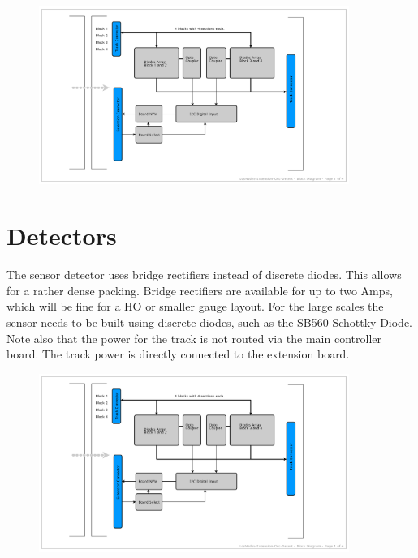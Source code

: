 \begin{figure}[htbp]
    \centering
    \includegraphics[page=2, width=0.9\textwidth]{./Schematics/Schematic_LcsNodes-Extension-4x4-Occ-Detect.pdf}
\end{figure}
\FloatBarrier

\section{Detectors}

The sensor detector uses bridge rectifiers instead of discrete diodes. This allows for a rather dense packing. Bridge rectifiers are available for up to two Amps, which will be fine for a HO or smaller gauge layout. For the large scales the sensor needs to be built using discrete diodes, such as the SB560 Schottky Diode. Note also that the power for the track is not routed via the main controller board. The track power is directly connected to the extension board.

\begin{figure}[htbp]
    \centering
    \includegraphics[page=3, width=0.9\textwidth]{./Schematics/Schematic_LcsNodes-Extension-4x4-Occ-Detect.pdf}
\end{figure}
\FloatBarrier


